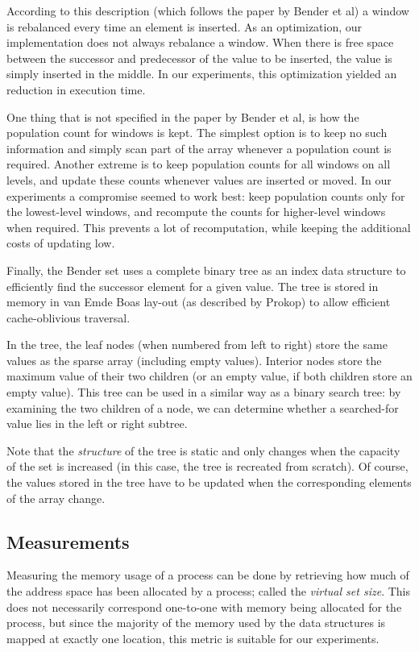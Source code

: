 \documentclass{acm_proc_article-sp}
\begin{document}
According to this description (which follows the paper by Bender et al) a window
is rebalanced every time an element is inserted. As an optimization, our
implementation does not always rebalance a window. When there is free space
between the successor and predecessor of the value to be inserted, the value
is simply inserted in the middle. In our experiments, this optimization
yielded an reduction in execution time.

One thing that is not specified in the paper by Bender et al, is how the
population count for windows is kept. The simplest option is to keep no such
information and simply scan part of the array whenever a population count is
required. Another extreme is to keep population counts for all windows on all
levels, and update these counts whenever values are inserted or moved. In
our experiments a compromise seemed to work best: keep population counts only
for the lowest-level windows, and recompute the counts for higher-level windows
when required. This prevents a lot of recomputation, while keeping the additional
costs of updating low.

Finally, the Bender set uses a complete binary tree as an index data structure
to efficiently find the successor element for a given value. The tree is
stored in memory in van Emde Boas lay-out (as described by Prokop) to allow
efficient cache-oblivious traversal.

In the tree, the leaf nodes (when numbered from left to right) store the same values
as the sparse array (including empty values).
Interior nodes store the maximum value of their two children (or an empty value,
if both children store an empty value).
This tree can be used in a similar way as a binary search tree: by examining the
two children of a node, we can determine whether a searched-for value lies in the
left or right subtree.

Note that the \emph{structure} of the tree is static and only changes when the
capacity of the set is increased (in this case, the tree is recreated from scratch).
Of course, the values stored in the tree have to be updated when the corresponding
elements of the array change.

\subsection{Measurements}
Measuring the memory usage of a process can be done by retrieving how much of the
address space has been allocated by a process; called the \emph{virtual set
size}. This does not necessarily correspond one-to-one with memory being allocated for the process, but since the majority of the memory used by the
data structures is mapped at exactly one location, this metric is suitable
for our experiments.
\end{document}
